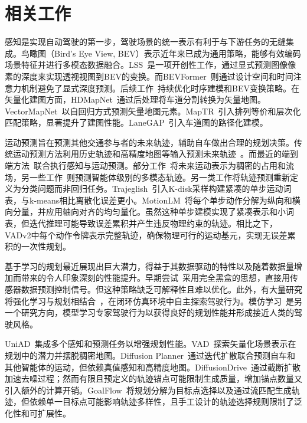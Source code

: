 \documentclass{article} %
\newcommand{\boldparagraph}[1]{\vspace{0.2cm}\noindent{\bf #1}}
\begin{document}
\vspace{-1mm}
\section{相关工作}
\vspace{-1mm}
\boldparagraph{感知。} 感知是实现自动驾驶的第一步，驾驶场景的统一表示有利于与下游任务的无缝集成。鸟瞰图（Bird's Eye View, BEV）表示近年来已成为通用策略，能够有效编码场景特征并进行多模态数据融合。LSS~\citep{philion2020lss}是一项开创性工作，通过显式预测图像像素的深度来实现透视视图到BEV的变换。而BEVFormer~\citep{li2022bevformer}则通过设计空间和时间注意力机制避免了显式深度预测。后续工作~\citep{li2022bevdepth, StreamPETR}持续优化时序建模和BEV变换策略。在矢量化建图方面，HDMapNet~\citep{li2022hdmapnet}通过后处理将车道分割转换为矢量地图。VectorMapNet~\citep{liu2022vectormapnet}以自回归方式预测矢量地图元素。MapTR~\citep{liao2022maptr, maptrv2}引入排列等价和层次化匹配策略，显著提升了建图性能。LaneGAP~\citep{lanegap}引入车道图的路径化建模。


\boldparagraph{运动预测。} 运动预测旨在预测其他交通参与者的未来轨迹，辅助自车做出合理的规划决策。传统运动预测方法利用历史轨迹和高精度地图等输入预测未来轨迹~\citep{gao2020vectornet, liu2021mmtrans}。而最近的端到端方法~\citep{gu2022vip3d, jiang2022pip}联合执行感知与运动预测。部分工作~\citep{hu2021fiery, zhang2022beverse}将未来运动表示为稠密的占用和流场，另一些工作~\citep{gu2022vip3d, jiang2022pip}则预测智能体级别的多模态轨迹。另一类工作将轨迹预测重新定义为分类问题而非回归任务。Trajeglish~\citep{philion2023trajeglish}引入K-disk采样构建紧凑的单步运动词表，与k-means相比离散化误差更小。MotionLM~\citep{seff2023motionlm}将每个单步动作分解为纵向和横向分量，并应用轴向对齐的均匀量化。虽然这种单步建模实现了紧凑表示和小词表，但迭代推理可能导致误差累积并产生违反物理约束的轨迹。相比之下，VADv2中每个动作令牌表示完整轨迹，确保物理可行的运动基元，实现无误差累积的一次性规划。


\boldparagraph{规划。} 基于学习的规划最近展现出巨大潜力，得益于其数据驱动的特性以及随着数据量增加而带来的令人印象深刻的性能提升。早期尝试~\citep{codevilla2019exploring, prakash2021multi}采用完全黑盒的思想，直接用传感器数据预测控制信号。但这种策略缺乏可解释性且难以优化。此外，有大量研究将强化学习与规划相结合~\citep{roach, gao2025rad}，在闭环仿真环境中自主探索驾驶行为。模仿学习~\citep{chekroun2021gri, hu2022stp3, ma2025leapvad}是另一个研究方向，模型学习专家驾驶行为以获得良好的规划性能并形成接近人类的驾驶风格。

UniAD~\citep{uniad}集成多个感知和预测任务以增强规划性能。VAD~\citep{vad}探索矢量化场景表示在规划中的潜力并摆脱稠密地图。Diffusion Planner~\citep{zheng2025diffusionplanner}通过迭代扩散联合预测自车和其他智能体的运动，但依赖真值感知和高精度地图。DiffusionDrive~\citep{liao2025diffusiondrive}通过截断扩散加速去噪过程；然而有限且预定义的轨迹锚点可能限制生成质量，增加锚点数量又引入额外的计算开销。GoalFlow~\citep{xing2025goalflow}将规划分解为目标点选择以及通过流匹配生成轨迹，但依赖单一目标点可能影响轨迹多样性，且手工设计的轨迹选择规则限制了泛化性和可扩展性。
\end{document}
